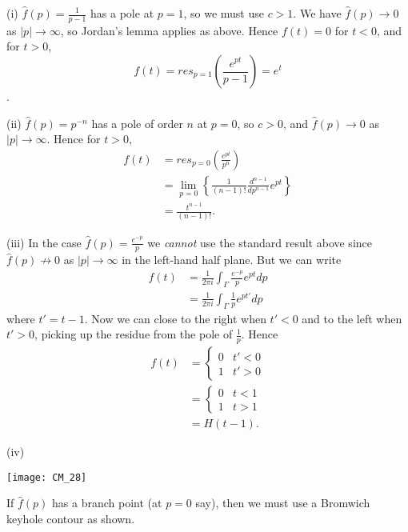 \documentclass[a4paper]{article}
\begin{document}
\begin{eg}
(i) $\hat{f}(p) = \frac{1}{p-1}$ has a pole at $p=1$, so we must use $c>1$. We have $\hat{f}(p) \to 0$ as $|p| \to \infty$, so Jordan's lemma applies as above. Hence $f(t) = 0$ for $t<0$, and for $t>0$, $$f(t) = res_{p=1} \left( \frac{e^{pt}}{p-1}\right) = e^t$$.

(ii) $\hat{f}(p) = p^{-n}$ has a pole of order $n$ at $p=0$, so $c>0$, and $\hat{f}(p) \to 0$ as $|p| \to \infty$. Hence for $t>0$, 
\begin{equation*}
\begin{aligned}
f(t) &= res_{p=0} \left(\frac{e^{pt}}{p^n}\right)\\
&= \lim_{p=0} \left\{ \frac{1}{(n-1)!} \frac{d^{n-1}}{dp^{n-1}} e^{pt} \right\}\\
&= \frac{t^{n-1}}{(n-1)!}.
\end{aligned}
\end{equation*}

(iii) In the case $\hat{f}(p) = \frac{e^{-p}}{p}$ we \emph{cannot} use the standard result above since $\hat{f}(p) \not\to 0$ as $|p| \to \infty$ in the left-hand half plane. But we can write
\begin{equation*}
\begin{aligned}
f(t) &= \frac{1}{2\pi i} \int_\Gamma \frac{e^{-p}}{p} e^{pt} dp\\
&= \frac{1}{2\pi i} \int_\Gamma \frac{1}{p} e^{pt'} dp
\end{aligned}
\end{equation*}
where $t' = t-1$. Now we can close to the right when $t'<0$ and to the left when $t'>0$, picking up the residue from the pole of $\frac{1}{p}$. Hence
\begin{equation*}
\begin{aligned}
f(t) &= \left\{ \begin{array}{ll}
0 & t'<0\\
1 & t'>0
\end{array}\right. \\&= \left\{ \begin{array}{ll}
0 & t<1\\
1 & t>1
\end{array}\right. \\&= H(t-1).
\end{aligned}
\end{equation*}

(iv) 

\texttt{[image: CM\_28]}

If $\hat{f}(p)$ has a branch point (at $p=0$ say), then we must use a Bromwich keyhole contour as shown.
\end{eg}
\end{document}
